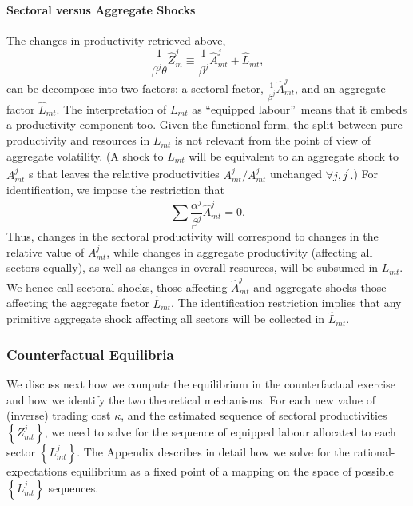 \documentclass[12pt]{article}
\begin{document}
\paragraph{Sectoral versus Aggregate Shocks}

The changes in productivity retrieved above, 
\begin{equation}
\frac{1}{\beta ^{j}\theta }\hat{Z}_{m}^{j}\equiv \frac{1}{\beta ^{j}}\hat{A}%
_{mt}^{j}+\hat{L}_{mt},  \label{prodchanges}
\end{equation}%
can be decompose into two factors: a sectoral factor, $\frac{1}{\beta ^{j}}%
\hat{A}_{mt}^{j}$, and an aggregate factor $\hat{L}_{mt}$. The
interpretation of $L_{mt}$ as \textquotedblleft equipped
labour\textquotedblright\ means that it embeds a productivity component too.
Given the functional form, the split between pure productivity and resources
in $L_{mt}$ is not relevant from the point of view of aggregate volatility.
(A shock to $L_{mt}$ will be equivalent to an aggregate shock to $A_{mt}^{j}$%
s that leaves the relative productivities $A_{mt}^{j}/A_{mt}^{j^{\prime }}$
unchanged $\forall j,j^{\prime }.$) For identification, we impose the
restriction that 
\begin{equation}
\sum \frac{\alpha ^{j}}{\beta ^{j}}\hat{A}_{mt}^{j}=0.  \label{idrestriction}
\end{equation}%
Thus, changes in the sectoral productivity will correspond to changes in the
relative value of $A_{mt}^{j}$, while changes in aggregate productivity
(affecting all sectors equally), as well as changes in overall resources,
will be subsumed in $L_{mt}$. We hence call sectoral shocks, those affecting 
$\hat{A}_{mt}^{j}$ and aggregate shocks those affecting the aggregate factor 
$\hat{L}_{mt}$. The identification restriction implies that any primitive
aggregate shock affecting all sectors will be collected in $\hat{L}_{mt}.$

\subsubsection{Counterfactual Equilibria}

We discuss next how we compute the equilibrium in the counterfactual
exercise and how we identify the two theoretical mechanisms. For each new
value of (inverse) trading cost $\kappa $, and the estimated sequence of
sectoral productivities $\left\{ Z_{mt}^{j}\right\} $, we need to solve for
the sequence of equipped labour allocated to each sector $\left\{
L_{mt}^{j}\right\} $. The Appendix describes in detail how we solve for the
rational-expectations equilibrium as a fixed point of a mapping on the space
of possible $\left\{ L_{mt}^{j}\right\} $ sequences.
\end{document}

